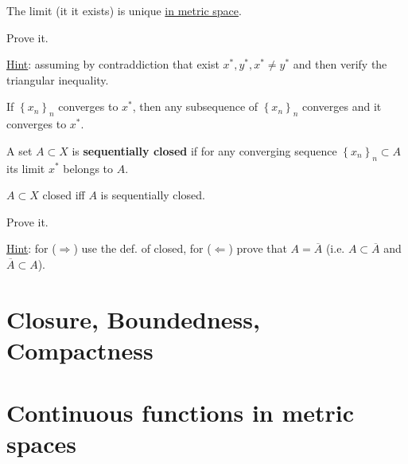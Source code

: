 \begin{prp}
The limit (it it exists) is unique \underline{in metric space}.
\end{prp}

\begin{home}
Prove it.

\underline{Hint}: assuming by contraddiction that exist $x^*,y^*,x^*\neq y^*$ and then verify the triangular inequality.
\newline
\newline
\newline
\newline
\end{home}

\begin{prp}
If $\left\{ x_n \right\}_{n}$ converges to $x^*$, then any subsequence of $\left\{ x_n \right\}_{n}$ converges and it converges to $x^*$.
\end{prp}

\begin{defn}
A set $A\subset X$ is \textbf{sequentially closed} if for any converging sequence $\left\{ x_n \right\}_{n}\subset A$ its limit $x^*$ belongs to $A$.
\end{defn}

\begin{prp}
$A\subset X$ closed iff $A$ is sequentially closed.
\end{prp}

\begin{home}
Prove it.

\underline{Hint}: for ($\Rightarrow$) use the def. of closed, for ($\Leftarrow$) prove that $A=\overline{A}$ (i.e. $A\subset\overline{A}$ and $\overline{A}\subset A$).
\newline
\newline
\newline
\newline
\end{home}


\newpage

\section{Closure, Boundedness, Compactness} %
\label{sec:closure_boundedness_compactness}


\section{Continuous functions in metric spaces} %
\label{sec:continuous_functions_in_metric_spaces}


